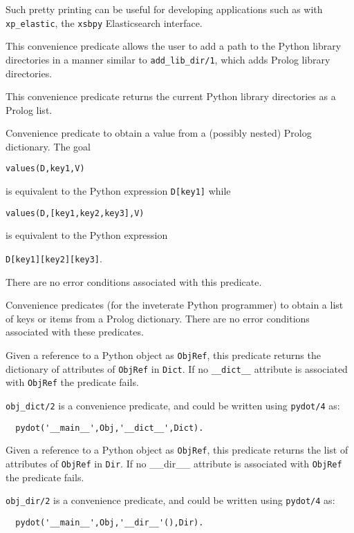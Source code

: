 \begin{description}
Such pretty printing can be useful for developing applications such as
with {\tt xp\_elastic}, the {\tt xsbpy} Elasticsearch interface.

%
This convenience predicate allows the user to add a path to the Python
library directories in a manner similar to {\tt add\_lib\_dir/1},
which adds Prolog library directories.

%
This convenience predicate returns the current Python library
directories as a Prolog list.

%
  Convenience predicate to obtain a value from a (possibly nested)
  Prolog dictionary.  The goal

  {\tt values(D,key1,V)}

\noindent
  is equivalent to the
  Python expression {\tt D[key1]} while

  {\tt values(D,[key1,key2,key3],V)}

\noindent
is equivalent to the Python expression

{\tt D[key1][key2][key3]}.

There are no error conditions associated with this predicate.

%
Convenience predicates (for the inveterate Python programmer) to
obtain a list of keys or items from a Prolog dictionary.  There are no
error conditions associated with these predicates.



%
Given a reference to a Python object as {\tt ObjRef}, this predicate
returns the dictionary of attributes of {\tt ObjRef} in {\tt Dict}.
If no {\tt \_\_dict\_\_} attribute is associated with {\tt ObjRef} the
predicate fails.

{\tt obj\_dict/2} is a convenience predicate, and could be written
using {\tt pydot/4} as:

\begin{verbatim}
  pydot('__main__',Obj,'__dict__',Dict).
\end{verbatim}

%
Given a reference to a Python object as {\tt ObjRef}, this predicate
returns the list of attributes of {\tt ObjRef} in {\tt Dir}.  If no
\_\_dir\_\_ attribute is associated with {\tt ObjRef} the predicate
fails.

{\tt obj\_dir/2} is a convenience predicate, and could be written
using {\tt pydot/4} as:

\begin{verbatim}
  pydot('__main__',Obj,'__dir__'(),Dir).
\end{verbatim}

\end{description}

